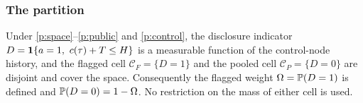 \subsubsection*{The partition}

\begin{lemma}
\label{lem:partition}
Under \ref{p:space}--\ref{p:public} and \ref{p:control}, the disclosure indicator
$D = \mathbf{1}\{a = 1,\ c(\tau) + T \le H\}$ is a measurable function of the control-node history, and
the flagged cell $\mathcal C_F = \{D = 1\}$ and the pooled cell $\mathcal C_P = \{D = 0\}$ are
disjoint and cover the space. Consequently the flagged weight $\Omega = \mathbb{P}(D = 1)$ is defined and
$\mathbb{P}(D = 0) = 1 - \Omega$. No restriction on the mass of either cell is used.
\end{lemma}

